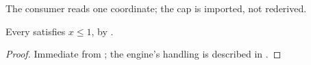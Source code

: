 
The consumer reads one coordinate; the cap is imported, not rederived.

\begin{proposition}\label{prop:cross}
Every  satisfies $x \le 1$, by .
\end{proposition}

\begin{proof}
Immediate from ; the engine's handling is described in
.
\end{proof}
